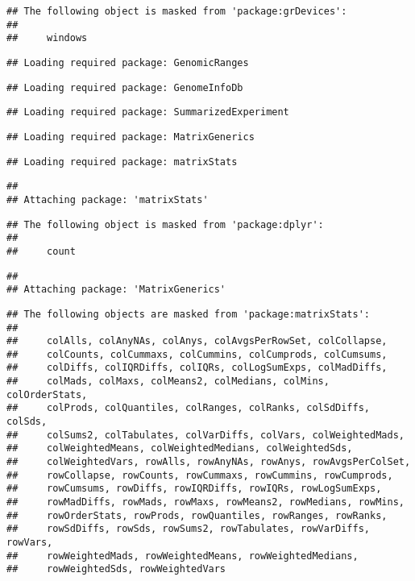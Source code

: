 \documentclass[
]{article}
\begin{document}
\begin{verbatim}
## The following object is masked from 'package:grDevices':
## 
##     windows
\end{verbatim}

\begin{verbatim}
## Loading required package: GenomicRanges
\end{verbatim}

\begin{verbatim}
## Loading required package: GenomeInfoDb
\end{verbatim}

\begin{verbatim}
## Loading required package: SummarizedExperiment
\end{verbatim}

\begin{verbatim}
## Loading required package: MatrixGenerics
\end{verbatim}

\begin{verbatim}
## Loading required package: matrixStats
\end{verbatim}

\begin{verbatim}
## 
## Attaching package: 'matrixStats'
\end{verbatim}

\begin{verbatim}
## The following object is masked from 'package:dplyr':
## 
##     count
\end{verbatim}

\begin{verbatim}
## 
## Attaching package: 'MatrixGenerics'
\end{verbatim}

\begin{verbatim}
## The following objects are masked from 'package:matrixStats':
## 
##     colAlls, colAnyNAs, colAnys, colAvgsPerRowSet, colCollapse,
##     colCounts, colCummaxs, colCummins, colCumprods, colCumsums,
##     colDiffs, colIQRDiffs, colIQRs, colLogSumExps, colMadDiffs,
##     colMads, colMaxs, colMeans2, colMedians, colMins, colOrderStats,
##     colProds, colQuantiles, colRanges, colRanks, colSdDiffs, colSds,
##     colSums2, colTabulates, colVarDiffs, colVars, colWeightedMads,
##     colWeightedMeans, colWeightedMedians, colWeightedSds,
##     colWeightedVars, rowAlls, rowAnyNAs, rowAnys, rowAvgsPerColSet,
##     rowCollapse, rowCounts, rowCummaxs, rowCummins, rowCumprods,
##     rowCumsums, rowDiffs, rowIQRDiffs, rowIQRs, rowLogSumExps,
##     rowMadDiffs, rowMads, rowMaxs, rowMeans2, rowMedians, rowMins,
##     rowOrderStats, rowProds, rowQuantiles, rowRanges, rowRanks,
##     rowSdDiffs, rowSds, rowSums2, rowTabulates, rowVarDiffs, rowVars,
##     rowWeightedMads, rowWeightedMeans, rowWeightedMedians,
##     rowWeightedSds, rowWeightedVars
\end{verbatim}
\end{document}

